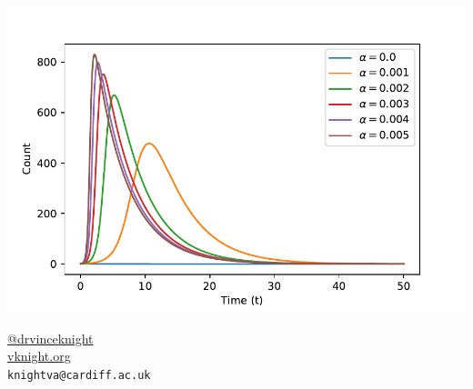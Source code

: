 \documentclass{beamer}
\begin{document}
    \begin{frame}
        \begin{center}
            \includegraphics[width=.95\textwidth]{./static/flatting_of_curve.pdf}
        \end{center}
    \end{frame}

    \begin{frame}
        \Huge
        \begin{center}
            \href{https://twitter.com/drvinceknight}{@drvinceknight}\\
            \url{vknight.org}\\
            \texttt{knightva@cardiff.ac.uk}
        \end{center}
    \end{frame}
\end{document}
